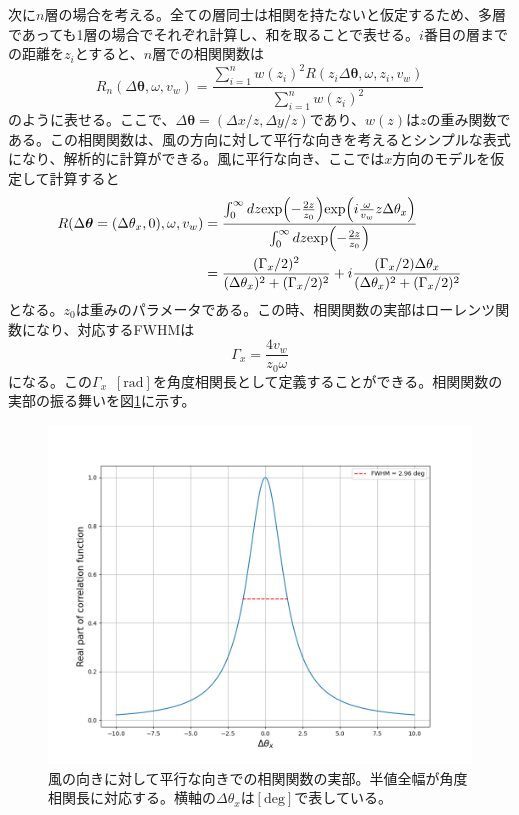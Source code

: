 次に$n$層の場合を考える。全ての層同士は相関を持たないと仮定するため、多層であっても1層の場合でそれぞれ計算し、和を取ることで表せる。$i$番目の層までの距離を$z_{i}$とすると、$n$層での相関関数は
\begin{equation}
  R_{n}(\Delta\bm{\theta},\omega,v_{w}) = \frac{\displaystyle\sum_{i=1}^{n}w(z_{i})^{2}R(z_{i}\Delta\bm{\theta},\omega,z_{i},v_{w})}{\displaystyle\sum_{i=1}^{n}w(z_{i})^{2}}
\end{equation}
のように表せる。ここで、$\Delta\bm{\theta} = (\Delta x/z, \Delta y/z)$であり、$w(z)$は$z$の重み関数である。この相関関数は、風の方向に対して平行な向きを考えるとシンプルな表式になり、解析的に計算ができる。風に平行な向き、ここでは$x$方向のモデルを仮定して計算すると
\begin{align}
  R(\Delta\bm{\theta} = (\Delta\theta_{x}, 0), \omega, v_{w}) &= \frac{\int_{0}^{\infty}dz\mathrm{exp}\Bigl(-\frac{2z}{z_{0}}\Bigr)\mathrm{exp}\Bigl(i\frac{\omega}{v_{w}}z\Delta\theta_{x}\Bigr)}{\int_{0}^{\infty}dz\mathrm{exp}\Bigl(-\frac{2z}{z_{0}}\Bigr)} \\
  &= \frac{(\Gamma_{x}/2)^{2}}{(\Delta\theta_{x})^{2} + (\Gamma_{x}/2)^{2}} + i\frac{(\Gamma_{x}/2)\Delta\theta_{x}}{(\Delta\theta_{x})^{2} + (\Gamma_{x}/2)^{2}}
\end{align}
となる。$z_{0}$は重みのパラメータである。この時、相関関数の実部はローレンツ関数になり、対応するFWHMは
\begin{equation}
  \Gamma_{x} = \frac{4v_{w}}{z_{0}\omega}
\end{equation}
になる。この$\Gamma_{x}$~$[\mathrm{rad}]$を角度相関長として定義することができる。相関関数の実部の振る舞いを図\ref{correlation_real}に示す。
\begin{figure}[htbp]
  \centering
  \includegraphics[width=0.8\columnwidth]{6_prospect/figs/correlation_real.png}
  \caption{風の向きに対して平行な向きでの相関関数の実部。半値全幅が角度相関長に対応する。横軸の$\Delta\theta_{x}$は$[\mathrm{deg}]$で表している。}
  \label{correlation_real}
\end{figure}
